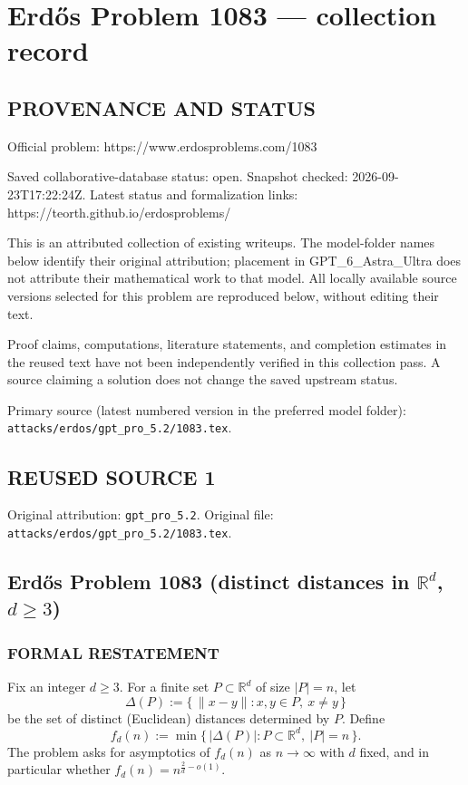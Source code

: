 \section*{Erd\H{o}s Problem 1083 --- collection record}

\subsection*{PROVENANCE AND STATUS}
Official problem: https://www.erdosproblems.com/1083

Saved collaborative-database status: open.
Snapshot checked: 2026-09-23T17:22:24Z.
Latest status and formalization links: https://teorth.github.io/erdosproblems/

This is an attributed collection of existing writeups. The model-folder names below identify their original attribution; placement in GPT\_6\_Astra\_Ultra does not attribute their mathematical work to that model. All locally available source versions selected for this problem are reproduced below, without editing their text.

Proof claims, computations, literature statements, and completion estimates in the reused text have not been independently verified in this collection pass. A source claiming a solution does not change the saved upstream status.

Primary source (latest numbered version in the preferred model folder): \texttt{attacks/erdos/gpt\_pro\_5.2/1083.tex}.

\subsection*{REUSED SOURCE 1}
Original attribution: \texttt{gpt\_pro\_5.2}.
Original file: \texttt{attacks/erdos/gpt\_pro\_5.2/1083.tex}.



\subsection*{Erd\H{o}s Problem 1083 (distinct distances in \(\mathbb{R}^d\), \(d\ge 3\))}

\subsubsection*{FORMAL RESTATEMENT}
Fix an integer \(d\ge 3\). For a finite set \(P\subset \mathbb{R}^d\) of size \(|P|=n\), let
\[
\Delta(P):=\{\,\|x-y\|: x,y\in P,\ x\ne y\,\}
\]
be the set of distinct (Euclidean) distances determined by \(P\). Define
\[
f_d(n):=\min\{\,|\Delta(P)|: P\subset\mathbb{R}^d,\ |P|=n\,\}.
\]
The problem asks for asymptotics of \(f_d(n)\) as \(n\to\infty\) with \(d\) fixed, and in particular whether
\(f_d(n)=n^{\frac{2}{d}-o(1)}\).

